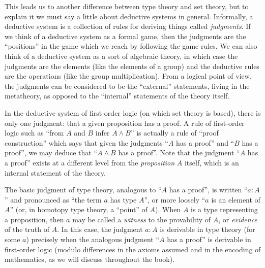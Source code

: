 This leads us to another difference between type theory and set theory, but to explain it we must say a little about deductive systems in general.
Informally, a deductive system is a collection of rules for deriving things called \emph{judgments}.
If we think of a deductive system as a formal game, then the judgments are the ``positions'' in the game which we reach by following the game rules.
We can also think of a deductive system as a sort of algebraic theory, in which case the judgments are the elements (like the elements of a group) and the deductive rules are the operations (like the group multiplication).
From a logical point of view, the judgments can be considered to be the ``external'' statements, living in the metatheory, as opposed to the ``internal'' statements of the theory itself.

In the deductive system of first-order logic (on which set theory is based), there is only one judgment: that a given proposition has a proof.
A rule of first-order logic such as ``from $A$ and $B$ infer $A\wedge B$'' is actually a rule of ``proof construction'' which says that given the judgments ``$A$ has a proof'' and ``$B$ has a proof'', we may deduce that ``$A\wedge B$ has a proof''.
Note that the judgment ``$A$ has a proof'' exists at a different level from the \emph{proposition} $A$ itself, which is an internal statement of the theory.

The basic judgment of type theory, analogous to ``$A$ has a proof'', is written ``$a:A$'' and pronounced as ``the term $a$ has type $A$'', or more loosely ``$a$ is an element of $A$'' (or, in homotopy type theory, a ``point'' of $A$).
When $A$ is a type representing a proposition, then $a$ may be called a \emph{witness} to the provability of $A$, or \emph{evidence} of the truth of $A$.
In this case, the judgment $a:A$ is derivable in type theory (for some $a$) precisely when the analogous judgment ``$A$ has a proof'' is derivable in first-order logic (modulo differences in the axioms assumed and in the encoding of mathematics, as we will discuss throughout the book).

